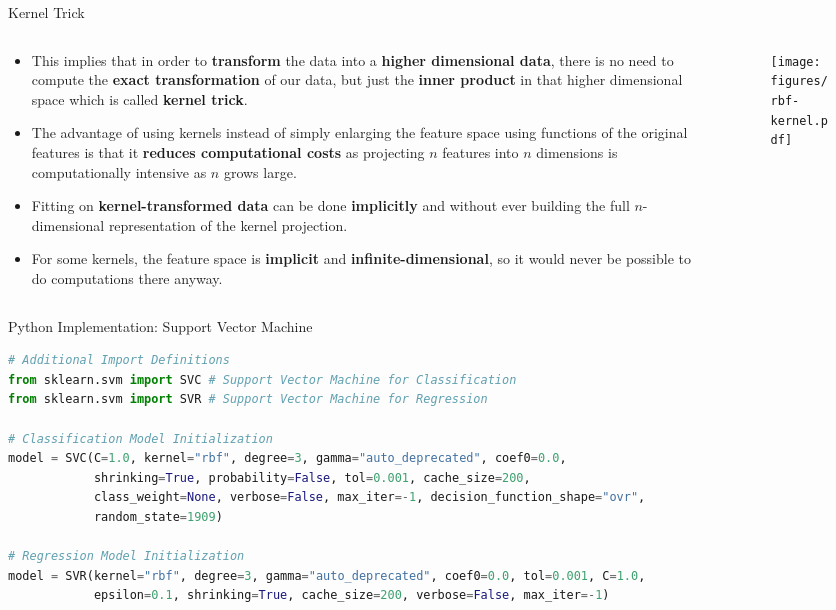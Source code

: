 \documentclass[document.tex]{subfiles}
\begin{document}
    \begin{frame}{Kernel Trick}
        \begin{columns}
            \begin{column}{0.6\textwidth}
                \begin{itemize}
                    \item  This implies that in order to \textbf{transform} the data into a \textbf{higher dimensional data}, there is no need to compute the \textbf{exact transformation} of our data, but just the \textbf{inner product} in that higher dimensional space which is called \textbf{kernel trick}.
                    \item The advantage of using kernels instead of simply enlarging the feature space using functions of the original features is that it \textbf{reduces computational costs} as projecting $n$ features into $n$ dimensions is computationally intensive as $n$ grows large.
                    \item Fitting on \textbf{kernel-transformed data} can be done \textbf{implicitly} and without ever building the full $n$-dimensional representation of the kernel projection.
                    \item For some kernels, the feature space is \textbf{implicit} and \textbf{infinite-dimensional}, so it would never be possible to do computations there anyway.
                \end{itemize}
            \end{column}
            \begin{column}{0.4\textwidth}
                \begin{figure}
                    \label{fig:rbf-kernel}
                    \texttt{[image: figures/rbf-kernel.pdf]}
                \end{figure}
            \end{column}
        \end{columns}
    \end{frame} 

    \begin{frame}[fragile]{Python Implementation: Support Vector Machine}
        \begin{lstlisting}[language=Python, style=material]
# Additional Import Definitions
from sklearn.svm import SVC # Support Vector Machine for Classification
from sklearn.svm import SVR # Support Vector Machine for Regression

# Classification Model Initialization
model = SVC(C=1.0, kernel="rbf", degree=3, gamma="auto_deprecated", coef0=0.0,
            shrinking=True, probability=False, tol=0.001, cache_size=200, 
            class_weight=None, verbose=False, max_iter=-1, decision_function_shape="ovr",
            random_state=1909)

# Regression Model Initialization
model = SVR(kernel="rbf", degree=3, gamma="auto_deprecated", coef0=0.0, tol=0.001, C=1.0, 
            epsilon=0.1, shrinking=True, cache_size=200, verbose=False, max_iter=-1)
        \end{lstlisting}
    \end{frame}
\end{document}
